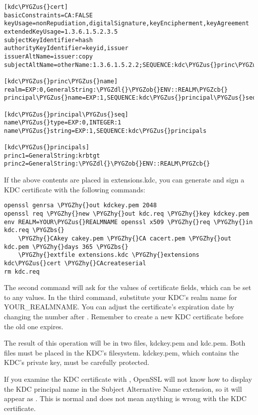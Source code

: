\documentclass[letterpaper,10pt,english]{sphinxmanual}
\def\PYGZbs{\char`\\}
\def\PYGZus{\char`\_}
\def\PYGZob{\char`\{}
\def\PYGZcb{\char`\}}
\def\PYGZdl{\char`\$}
\def\PYGZhy{\char`\-}
\begin{document}
\begin{Verbatim}[commandchars=\\\{\}]
[kdc\PYGZus{}cert]
basicConstraints=CA:FALSE
keyUsage=nonRepudiation,digitalSignature,keyEncipherment,keyAgreement
extendedKeyUsage=1.3.6.1.5.2.3.5
subjectKeyIdentifier=hash
authorityKeyIdentifier=keyid,issuer
issuerAltName=issuer:copy
subjectAltName=otherName:1.3.6.1.5.2.2;SEQUENCE:kdc\PYGZus{}princ\PYGZus{}name

[kdc\PYGZus{}princ\PYGZus{}name]
realm=EXP:0,GeneralString:\PYGZdl{}\PYGZob{}ENV::REALM\PYGZcb{}
principal\PYGZus{}name=EXP:1,SEQUENCE:kdc\PYGZus{}principal\PYGZus{}seq

[kdc\PYGZus{}principal\PYGZus{}seq]
name\PYGZus{}type=EXP:0,INTEGER:1
name\PYGZus{}string=EXP:1,SEQUENCE:kdc\PYGZus{}principals

[kdc\PYGZus{}principals]
princ1=GeneralString:krbtgt
princ2=GeneralString:\PYGZdl{}\PYGZob{}ENV::REALM\PYGZcb{}
\end{Verbatim}

If the above contents are placed in extensions.kdc, you can generate
and sign a KDC certificate with the following commands:

\begin{Verbatim}[commandchars=\\\{\}]
openssl genrsa \PYGZhy{}out kdckey.pem 2048
openssl req \PYGZhy{}new \PYGZhy{}out kdc.req \PYGZhy{}key kdckey.pem
env REALM=YOUR\PYGZus{}REALMNAME openssl x509 \PYGZhy{}req \PYGZhy{}in kdc.req \PYGZbs{}
    \PYGZhy{}CAkey cakey.pem \PYGZhy{}CA cacert.pem \PYGZhy{}out kdc.pem \PYGZhy{}days 365 \PYGZbs{}
    \PYGZhy{}extfile extensions.kdc \PYGZhy{}extensions kdc\PYGZus{}cert \PYGZhy{}CAcreateserial
rm kdc.req
\end{Verbatim}

The second command will ask for the values of certificate fields,
which can be set to any values.  In the third command, substitute your
KDC's realm name for YOUR\_REALMNAME.  You can adjust the certificate's
expiration date by changing the number after .  Remember to
create a new KDC certificate before the old one expires.

The result of this operation will be in two files, kdckey.pem and
kdc.pem.  Both files must be placed in the KDC's filesystem.
kdckey.pem, which contains the KDC's private key, must be carefully
protected.

If you examine the KDC certificate with , OpenSSL will not know how to display the KDC principal
name in the Subject Alternative Name extension, so it will appear as
.  This is normal and does not mean
anything is wrong with the KDC certificate.
\end{document}
